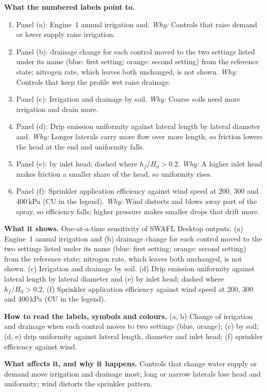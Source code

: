 \textbf{What the numbered labels point to.}
\begin{enumerate}[nosep,label=\protect\circled{\arabic*}]
\item Panel (a): Engine~1 annual irrigation and. \emph{Why:} Controls that raise demand or lower supply raise irrigation.
\item Panel (b): drainage change for each control moved to the two settings listed under its name (blue: first setting; orange: second setting) from the reference state; nitrogen rate, which leaves both unchanged, is not shown. \emph{Why:} Controls that keep the profile wet raise drainage.
\item Panel (c): Irrigation and drainage by soil. \emph{Why:} Coarse soils need more irrigation and drain more.
\item Panel (d): Drip emission uniformity against lateral length by lateral diameter and. \emph{Why:} Longer laterals carry more flow over more length, so friction lowers the head at the end and uniformity falls.
\item Panel (e): by inlet head; dashed where $h_f/H_0>0.2$. \emph{Why:} A higher inlet head makes friction a smaller share of the head, so uniformity rises.
\item Panel (f): Sprinkler application efficiency against wind speed at 200, 300 and 400\,kPa (CU in the legend). \emph{Why:} Wind distorts and blows away part of the spray, so efficiency falls; higher pressure makes smaller drops that drift more.
\end{enumerate}

\textbf{What it shows.} One-at-a-time sensitivity of SWAFL Desktop outputs. (a) Engine~1 annual irrigation and (b) drainage change for each control moved to the two settings listed under its name (blue: first setting; orange: second setting) from the reference state; nitrogen rate, which leaves both unchanged, is not shown. (c) Irrigation and drainage by soil. (d) Drip emission uniformity against lateral length by lateral diameter and (e) by inlet head; dashed where $h_f/H_0>0.2$. (f) Sprinkler application efficiency against wind speed at 200, 300 and 400\,kPa (CU in the legend).

\textbf{How to read the labels, symbols and colours.} (a, b) Change of irrigation and drainage when each control moves to two settings (blue, orange); (c) by soil; (d, e) drip uniformity against lateral length, diameter and inlet head; (f) sprinkler efficiency against wind.

\textbf{What affects it, and why it happens.} Controls that change water supply or demand move irrigation and drainage most; long or narrow laterals lose head and uniformity; wind distorts the sprinkler pattern.

